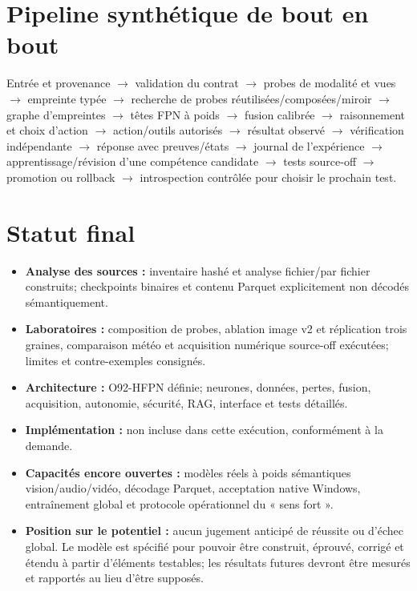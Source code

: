 \documentclass[11pt,a4paper]{report}
\begin{document}
\section{Pipeline synthétique de bout en bout}
Entrée et provenance $\rightarrow$ validation du contrat $\rightarrow$ probes de modalité et vues $\rightarrow$ empreinte typée $\rightarrow$ recherche de probes réutilisées/composées/miroir $\rightarrow$ graphe d'empreintes $\rightarrow$ têtes FPN à poids $\rightarrow$ fusion calibrée $\rightarrow$ raisonnement et choix d'action $\rightarrow$ action/outils autorisés $\rightarrow$ résultat observé $\rightarrow$ vérification indépendante $\rightarrow$ réponse avec preuves/états $\rightarrow$ journal de l'expérience $\rightarrow$ apprentissage/révision d'une compétence candidate $\rightarrow$ tests source-off $\rightarrow$ promotion ou rollback $\rightarrow$ introspection contrôlée pour choisir le prochain test.

\section{Statut final}
\begin{itemize}[leftmargin=1.5em]
\item \textbf{Analyse des sources :} inventaire hashé et analyse fichier/par fichier construits; checkpoints binaires et contenu Parquet explicitement non décodés sémantiquement.
\item \textbf{Laboratoires :} composition de probes, ablation image v2 et réplication trois graines, comparaison météo et acquisition numérique source-off exécutées; limites et contre-exemples consignés.
\item \textbf{Architecture :} O92-HFPN définie; neurones, données, pertes, fusion, acquisition, autonomie, sécurité, RAG, interface et tests détaillés.
\item \textbf{Implémentation :} non incluse dans cette exécution, conformément à la demande.
\item \textbf{Capacités encore ouvertes :} modèles réels à poids sémantiques vision/audio/vidéo, décodage Parquet, acceptation native Windows, entraînement global et protocole opérationnel du « sens fort ».
\item \textbf{Position sur le potentiel :} aucun jugement anticipé de réussite ou d'échec global. Le modèle est spécifié pour pouvoir être construit, éprouvé, corrigé et étendu à partir d'éléments testables; les résultats futures devront être mesurés et rapportés au lieu d'être supposés.
\end{itemize}
\end{document}
